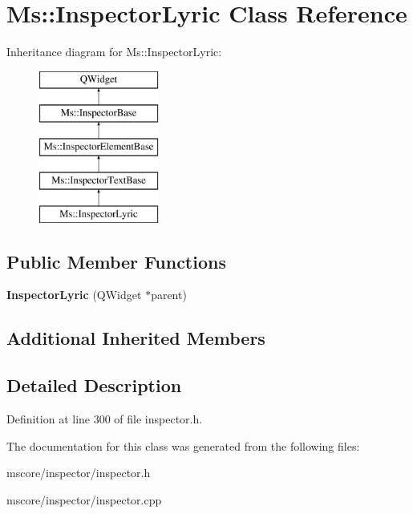 \hypertarget{class_ms_1_1_inspector_lyric}{}\section{Ms\+:\+:Inspector\+Lyric Class Reference}
\label{class_ms_1_1_inspector_lyric}
Inheritance diagram for Ms\+:\+:Inspector\+Lyric\+:\begin{figure}[H]
\begin{center}
\leavevmode
\includegraphics[height=5.000000cm]{class_ms_1_1_inspector_lyric}
\end{center}
\end{figure}
\subsection*{Public Member Functions}
\begin{DoxyCompactItemize}
\item 
\mbox{\label{class_ms_1_1_inspector_lyric_aaddae2d443239a7a0e39fb529ec90c10}} 
{\bfseries Inspector\+Lyric} (Q\+Widget $\ast$parent)
\end{DoxyCompactItemize}
\subsection*{Additional Inherited Members}


\subsection{Detailed Description}


Definition at line 300 of file inspector.\+h.



The documentation for this class was generated from the following files\+:\begin{DoxyCompactItemize}
\item 
mscore/inspector/inspector.\+h\item 
mscore/inspector/inspector.\+cpp\end{DoxyCompactItemize}
